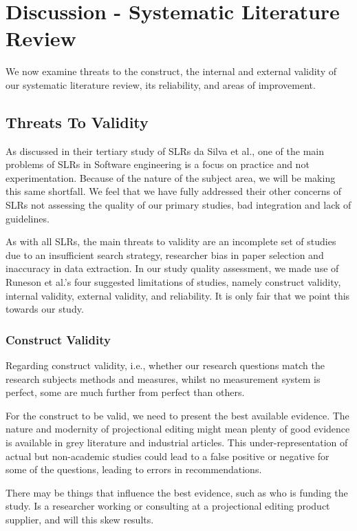 \section{Discussion - Systematic Literature Review}
We now examine threats to the construct, the internal and external validity of our systematic literature review, its reliability, and areas of improvement.

 
\subsection{Threats To Validity}  
As discussed in their tertiary study of SLRs da Silva et al.\cite{DaSilvaFabioQ.B2011Syos}, one of the main problems of SLRs in Software engineering is a focus on practice and not experimentation.
Because of the nature of the subject area, we will be making this same shortfall. 
We feel that we have fully addressed their other concerns of SLRs not assessing the quality of our primary studies, bad integration and lack of guidelines.

As with all SLRs, the main threats to validity are an incomplete set of studies due to an insufficient search strategy, researcher bias in paper selection and inaccuracy in data extraction.
In our study quality assessment, we made use of Runeson et al.'s\cite{runeson2009guidelines} four suggested limitations of studies, namely construct validity, internal validity, external validity, and reliability.
It is only fair that we point this towards our study.

\subsubsection{Construct Validity}
Regarding construct validity, i.e., whether our research questions match the research subjects methods and measures, whilst no measurement system is perfect, some are much further from perfect than others.

For the construct to be valid, we need to present the best available evidence.
The nature and modernity of projectional editing might mean plenty of good evidence is available in grey literature and industrial articles. 
This under-representation of actual but non-academic studies could lead to a false positive or negative for some of the questions, leading to errors in recommendations.

There may be things that influence the best evidence, such as who is funding the study. 
Is a researcher working or consulting at a projectional editing product supplier, and will this skew results.

